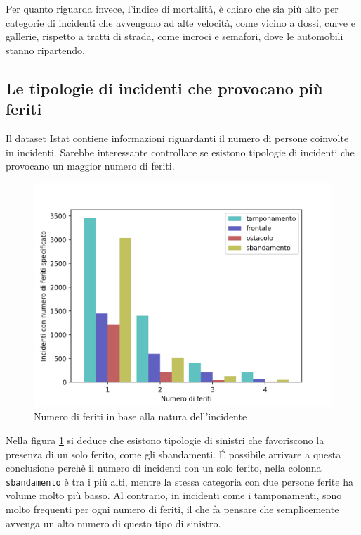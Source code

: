 \documentclass[a4paper]{report}
\newcommand{\columnstyle}[1]{\texttt{#1}}
\begin{document}
Per quanto riguarda invece, l'indice di mortalità, è chiaro che sia più alto 
per categorie di incidenti che avvengono ad alte velocità, come vicino a dossi, 
curve e gallerie, rispetto a tratti di strada, come incroci e semafori, 
dove le automobili stanno ripartendo.

\subsection{Le tipologie di incidenti che provocano più feriti}

Il dataset Istat contiene informazioni riguardanti il numero di persone coinvolte 
in incidenti.
Sarebbe interessante controllare se esistono tipologie di incidenti che provocano 
un maggior numero di feriti.

\begin{figure}
    \includegraphics[width=\linewidth]{../src/incidenti/incidenti_senza_coords/natura_incidente/natura_incidente.png}
    \caption{Numero di feriti in base alla natura dell'incidente}
    \label{fig:numero-feriti}
\end{figure}

Nella figura \ref{fig:numero-feriti} si deduce che esistono tipologie di sinistri 
che favoriscono la presenza di un solo ferito, come gli sbandamenti. 
\'E possibile arrivare a questa conclusione perchè il numero di incidenti con 
un solo ferito, nella colonna \columnstyle{sbandamento} è tra i più alti, 
mentre la stessa categoria con due persone ferite ha volume molto più basso.
Al contrario, in incidenti come i tamponamenti, sono molto frequenti per ogni 
numero di feriti, il che fa pensare che semplicemente avvenga un alto numero 
di questo tipo di sinistro.
\end{document}
